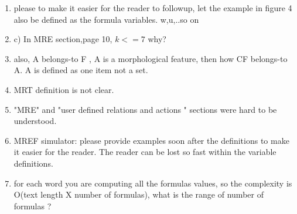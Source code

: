 \begin{enumerate}[leftmargin=0mm,label=\bfseries CommentR3.\arabic*]
\item \label{Review.3.15}
please to make it easier for the reader to followup, 
let the example in figure 4 also be defined as the formula 
variables. w,{u},..so on



\item \label{Review.3.16}
c) In MRE section,page 10, $k <=7$ why? 


\item \label{Review.3.17}
also, A belongs-to F , A is a morphological feature, 
then how CF belongs-to A. A is defined as one item not a set.




\item \label{Review.3.18}
MRT definition is not clear.




\item \label{Review.3.19}
"MRE" and "user defined relations and actions " sections 
were hard to be understood.



\item \label{Review.3.20}
MREF simulator: please provide examples soon after the 
definitions to make it easier for the reader. 
The reader can be lost so fast within the variable definitions. 



\item \label{Review.3.21}
for each word you are computing all the formulas values, 
so the complexity is O(text length X number of formulas), 
what is the range of number of formulas ?


\end{enumerate}
